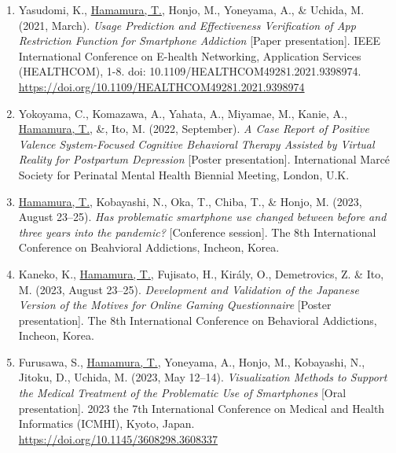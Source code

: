 \documentclass[a4paper]{article}
\begin{document}
\begin{enumerate}
	\item Yasudomi, K., \underline{Hamamura, T.}, Honjo, M., Yoneyama, A., \& Uchida, M. (2021, March). \textit{Usage Prediction and Effectiveness Verification of App Restriction Function for Smartphone Addiction} [Paper presentation]. IEEE International Conference on E-health Networking, Application Services (HEALTHCOM), 1-8. doi: 10.1109/HEALTHCOM49281.2021.9398974.  \url{https://doi.org/10.1109/HEALTHCOM49281.2021.9398974}
	\item Yokoyama, C., Komazawa, A., Yahata, A., Miyamae, M., Kanie, A., \underline{Hamamura, T.}, \&, Ito, M. (2022, September). \textit{A Case Report of Positive Valence System-Focused Cognitive Behavioral Therapy Assisted by Virtual Reality for Postpartum Depression} [Poster presentation]. International Marc\'e Society for Perinatal Mental Health Biennial Meeting, London, U.K.
	\item \underline{Hamamura, T.}, Kobayashi, N., Oka, T., Chiba, T., \& Honjo, M. (2023, August 23--25). \textit{Has problematic smartphone use changed between before and three years into the pandemic?} [Conference session]. The 8th International Conference on Beahvioral Addictions, Incheon, Korea.
	\item Kaneko, K., \underline{Hamamura, T.}, Fujisato, H., Király, O., Demetrovics, Z. \& Ito, M. (2023, August 23--25). \textit{Development and Validation of the Japanese Version of the Motives for Online Gaming Questionnaire} [Poster presentation]. The 8th International Conference on Behavioral Addictions, Incheon, Korea.
	\item Furusawa, S., \underline{Hamamura, T.}, Yoneyama, A., Honjo, M., Kobayashi, N., Jitoku, D., Uchida, M. (2023, May 12--14). \textit{Visualization Methods to Support the Medical Treatment of the Problematic Use of Smartphones} [Oral presentation]. 2023 the 7th International Conference on Medical and Health Informatics (ICMHI), Kyoto, Japan.  \url{https://doi.org/10.1145/3608298.3608337}
\end{enumerate}
\end{document}
